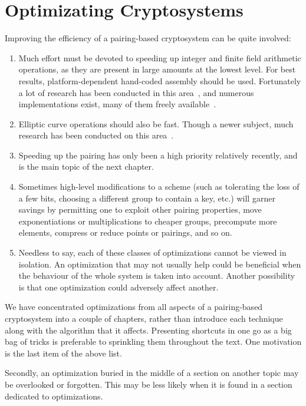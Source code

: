 \chapter{Optimizating Cryptosystems}

Improving the efficiency of a pairing-based cryptosystem can be quite involved:

\begin{enumerate}
\item
Much effort must be devoted to speeding up
integer and finite field arithmetic operations, as they are present
in large amounts at the lowest level. For best results, platform-dependent
hand-coded assembly should be used.
Fortunately a lot of research has been conducted in this area~\cite{taocp2},
and numerous implementations exist, many of them freely available~\cite{gmp, miracl}.
\item
Elliptic curve operations should also be fast. Though a newer subject,
much research has been conducted on this area~\cite{bss}.
\item
Speeding up the pairing has only been a high priority relatively recently,
and is the main topic of the next chapter.
\item
Sometimes high-level modifications to a scheme (such as tolerating the
loss of a few bits, choosing a different group to contain a key, etc.)
will garner savings by
permitting one to
exploit other pairing properties,
move exponentiations or multiplications to cheaper groups,
precompute more elements,
compress or reduce points or pairings, and so on.
\item
Needless to say, each of these classes of optimizations cannot be viewed
in isolation. An optimization that may not usually help could be beneficial
when the behaviour of the whole system is taken into account.
Another possibility is that
one optimization could adversely affect another.
\end{enumerate}

We have concentrated optimizations from all aspects of
a pairing-based cryptosystem into a couple of chapters,
rather than introduce each technique along with the algorithm that it
affects. Presenting shortcuts in one go as a big bag of tricks is
preferable to sprinkling them throughout the text.
One motivation is the last item of the above list.

Secondly, an optimization buried in the middle of a section on another topic
may be overlooked or forgotten. This may be less likely when it is found in
a section dedicated to optimizations.

